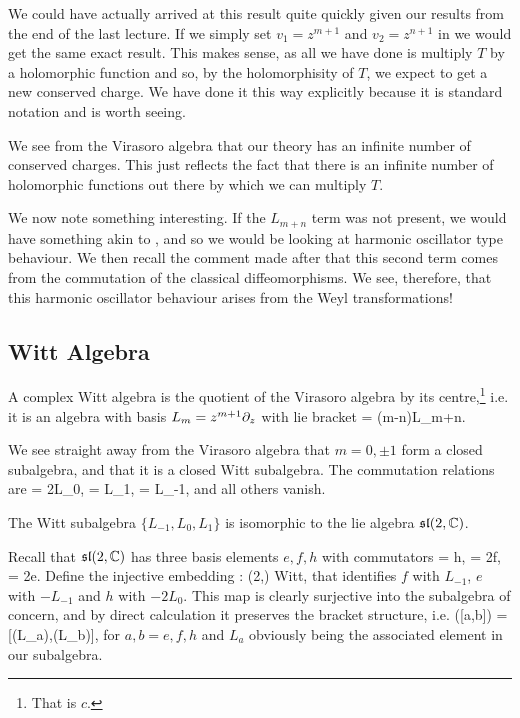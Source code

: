 \br 
We could have actually arrived at this result quite quickly given our results from the end of the last lecture. If we simply set $v_1=z^{m+1}$ and $v_2=z^{n+1}$ in  we would get the same exact result. This makes sense, as all we have done is multiply $T$ by a holomorphic function and so, by the holomorphisity of $T$, we expect to get a new conserved charge. We have done it this way explicitly because it is standard notation and is worth seeing.
\er 

\br 
We see from the Virasoro algebra that our theory has an infinite number of conserved charges. This just reflects the fact that there is an infinite number of holomorphic functions out there by which we can multiply $T$.
\er 

We now note something interesting. If the $L_{m+n}$ term was not present, we would have something akin to , and so we would be looking at harmonic oscillator type behaviour. We then recall the comment made after  that this second term comes from the commutation of the classical diffeomorphisms. We see, therefore, that this harmonic oscillator behaviour arises from the Weyl transformations!

\subsection{Witt Algebra}

\bd 
A complex Witt algebra is the quotient of the Virasoro algebra by its centre,\footnote{That is $c$.} i.e. it is an algebra with basis $L_m = z^{m+1}\partial_z$ with lie bracket 
\bse
    [L_m,L_n] = (m-n)L_{m+n}.
\ese 
\ed 

We see straight away from the Virasoro algebra that $m=0,\pm1$ form a closed subalgebra, and that it is a closed Witt subalgebra. The commutation relations are
\bse 
    [L_1,L_{-1}] = 2L_0, \qquad [L_1,L_0] = L_1, \qquad  [L_0,L_{-1}] = L_{-1},
\ese
and all others vanish.

\bp 
The Witt subalgebra $\{L_{-1},L_0,L_1\}$ is isomorphic to the lie algebra $\mathfrak{sl}(2,\mathbb{C})$.
\ep 

\bq 
Recall that $\mathfrak{sl}(2,\mathbb{C})$ has three basis elements $e,f,h$ with commutators 
\bse 
    [e,f] = h, \qquad [f,h] = 2f, \qquad [h,e] = 2e.
\ese 
Define the injective embedding
\bse 
    \iota : (2,\C) \hookrightarrow Witt,
\ese 
that identifies $f$ with $L_{-1}$, $e$ with $-L_{-1}$ and $h$ with $-2L_0$. This map is clearly surjective into the subalgebra of concern, and by direct calculation it preserves the bracket structure, i.e. 
\bse 
    \iota([a,b]) = [\iota(L_a),\iota(L_b)],
\ese 
for $a,b=e,f,h$ and $L_a$ obviously being the associated element in our subalgebra. 
\eq 

